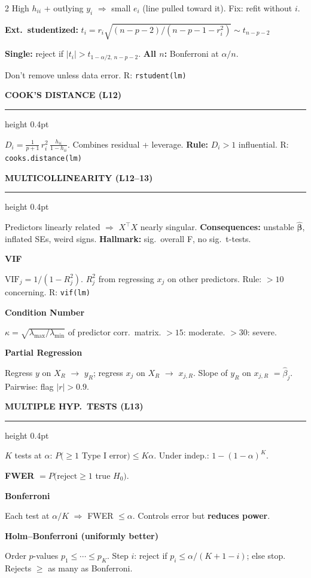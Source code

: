 \documentclass[7pt]{extarticle}
\newcommand{\msection}[1]{%
  \vspace{4pt}%
  {\small\bfseries\color{blue!70!black}\MakeUppercase{#1}}%
  \vspace{1pt}%
  \par\nobreak%
  {\color{blue!70!black}\hrule height 0.4pt}%
  \vspace{2pt}\par\nobreak%
}
\newcommand{\msubsection}[1]{%
  \vspace{2pt}%
  {\footnotesize\bfseries\color{purple!70!black}#1}%
  \vspace{1pt}\par\nobreak%
}
\newcommand{\bhat}{\hat{\bm{\beta}}}
\newcommand{\XtX}{X^\top X}
\begin{document}
\begin{multicols*}{2}
High $h_{ii}$ + outlying $y_i$ $\Rightarrow$ small $e_i$ (line pulled toward it). Fix: refit without $i$.

\textbf{Ext.\ studentized:} $t_i = r_i\sqrt{(n{-}p{-}2)/(n{-}p{-}1{-}r_i^2)} \sim t_{n-p-2}$

\textbf{Single:} reject if $|t_i| > t_{1-\alpha/2,\,n-p-2}$. \textbf{All $n$:} Bonferroni at $\alpha/n$.

Don't remove unless data error. R: \texttt{rstudent(lm)}

\msection{Cook's Distance (L12)}

$D_i = \frac{1}{p{+}1}\,r_i^2\,\frac{h_{ii}}{1{-}h_{ii}}$. Combines residual + leverage. \textbf{Rule:} $D_i > 1$ influential. R: \texttt{cooks.distance(lm)}

\msection{Multicollinearity (L12--13)}

Predictors linearly related $\Rightarrow$ $\XtX$ nearly singular. \textbf{Consequences:} unstable $\bhat$, inflated SEs, weird signs. \textbf{Hallmark:} sig.\ overall F, no sig.\ t-tests.

\msubsection{VIF}
$\text{VIF}_j = 1/(1{-}R_j^2)$. $R_j^2$ from regressing $x_j$ on other predictors. Rule: $>10$ concerning. R: \texttt{vif(lm)}

\msubsection{Condition Number}
$\kappa = \sqrt{\lambda_{\max}/\lambda_{\min}}$ of predictor corr.\ matrix. $>15$: moderate. $>30$: severe.

\msubsection{Partial Regression}
Regress $y$ on $X_R$ $\to$ $y_R$; regress $x_j$ on $X_R$ $\to$ $x_{j,R}$. Slope of $y_R$ on $x_{j,R}$ $= \hat\beta_j$. Pairwise: flag $|r|>0.9$.

\msection{Multiple Hyp.\ Tests (L13)}

$K$ tests at $\alpha$: $P(\ge\!1$ Type I error$) \le K\alpha$. Under indep.: $1{-}(1{-}\alpha)^K$.

\textbf{FWER} $= P(\text{reject}\ge 1$ true $H_0)$.

\msubsection{Bonferroni}
Each test at $\alpha/K$ $\Rightarrow$ FWER $\le \alpha$. Controls error but \textbf{reduces power}.

\msubsection{Holm--Bonferroni (uniformly better)}
Order $p$-values $p_1 \le \cdots \le p_K$. Step $i$: reject if $p_i \le \alpha/(K{+}1{-}i)$; else stop. Rejects $\ge$ as many as Bonferroni.


\end{multicols*}
\end{document}
